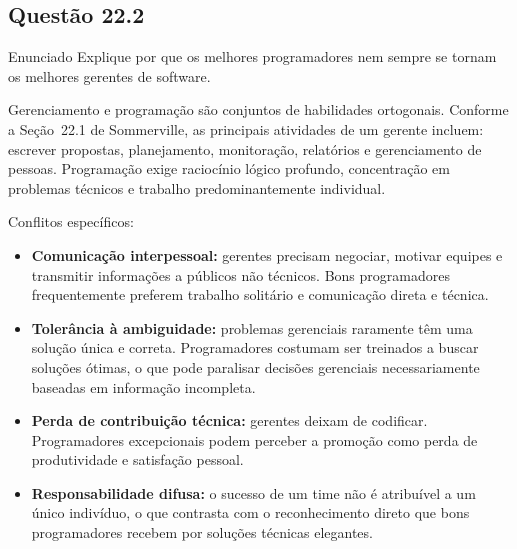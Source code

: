 \documentclass[12pt,a4paper]{article}
\begin{document}
\subsection*{Questão 22.2}
\begin{questao}{Enunciado}
Explique por que os melhores programadores nem sempre se tornam os melhores
gerentes de software.
\end{questao}
\begin{resposta}
Gerenciamento e programação são conjuntos de habilidades ortogonais.
Conforme a Seção~22.1 de Sommerville, as principais atividades de um gerente
incluem: escrever propostas, planejamento, monitoração, relatórios e
gerenciamento de pessoas. Programação exige raciocínio lógico profundo,
concentração em problemas técnicos e trabalho predominantemente individual.

Conflitos específicos:
\begin{itemize}[nosep]
  \item \textbf{Comunicação interpessoal:} gerentes precisam negociar, motivar
        equipes e transmitir informações a públicos não técnicos. Bons
        programadores frequentemente preferem trabalho solitário e comunicação
        direta e técnica.
  \item \textbf{Tolerância à ambiguidade:} problemas gerenciais raramente têm
        uma solução única e correta. Programadores costumam ser treinados a
        buscar soluções ótimas, o que pode paralisar decisões gerenciais
        necessariamente baseadas em informação incompleta.
  \item \textbf{Perda de contribuição técnica:} gerentes deixam de codificar.
        Programadores excepcionais podem perceber a promoção como perda de
        produtividade e satisfação pessoal.
  \item \textbf{Responsabilidade difusa:} o sucesso de um time não é
        atribuível a um único indivíduo, o que contrasta com o reconhecimento
        direto que bons programadores recebem por soluções técnicas elegantes.
\end{itemize}
\end{resposta}

\end{document}
